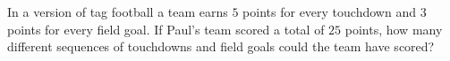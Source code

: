 In a version of tag football a team earns $5$ points for every touchdown and $3$ points for every field goal. If Paul's team scored a total of $25$ points, how many different sequences of touchdowns and field goals could the team have scored?
